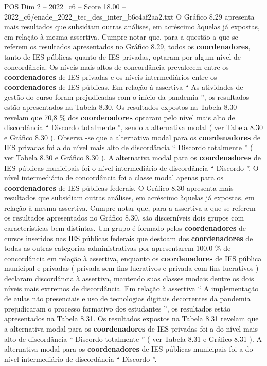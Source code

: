 \begin{textsample}{POS Dim 2 – 2022\_c6 – Score 18.00 – 2022\_c6/enade\_2022\_tec\_des\_inter\_b6c4af2aa2.txt}
O Gráfico 8.29 apresenta mais resultados que subsidiam outras análises, em acréscimo àquelas já expostas, em relação à mesma assertiva.
Cumpre notar que, para a questão a que se referem os resultados apresentados no Gráfico 8.29, todos os \textbf{coordenadores}, tanto de IES públicas quanto de IES privadas, optaram por algum nível de concordância.
Os níveis mais altos de concordância prevalecem entre os \textbf{coordenadores} de IES privadas e os níveis intermediários entre os \textbf{coordenadores} de IES públicas.
Em relação à assertiva “ As atividades de gestão do curso foram prejudicadas com o início da pandemia ”, os resultados estão apresentados na Tabela 8.30.
Os resultados expostos na Tabela 8.30 revelam que 70,8 \% dos \textbf{coordenadores} optaram pelo nível mais alto de discordância “ Discordo totalmente ”, sendo a alternativa modal ( ver Tabela 8.30 e Gráfico 8.30 ).
Observa -se que a alternativa modal para os \textbf{coordenadores} de IES privadas foi a do nível mais alto de discordância “ Discordo totalmente ” ( ver Tabela 8.30 e Gráfico 8.30 ).
A alternativa modal para os \textbf{coordenadores} de IES públicas municipais foi o nível intermediário de discordância “ Discordo ”.
O nível intermediário de concordância foi a classe modal apenas para os \textbf{coordenadores} de IES públicas federais.
O Gráfico 8.30 apresenta mais resultados que subsidiam outras análises, em acréscimo àquelas já expostas, em relação à mesma assertiva.
Cumpre notar que, para a assertiva a que se referem os resultados apresentados no Gráfico 8.30, são discerníveis dois grupos com características bem distintas.
Um grupo é formado pelos \textbf{coordenadores} de cursos inseridos nas IES públicas federais que destoam dos \textbf{coordenadores} de todas as outras categorias administrativas por apresentarem 100,0 \% de concordância em relação à assertiva, enquanto os \textbf{coordenadores} de IES pública municipal e privadas ( privada sem fins lucrativos e privada com fins lucrativos ) declaram discordância à assertiva, mantendo suas classes modais dentre os dois níveis mais extremos de discordância.
Em relação à assertiva “ A implementação de aulas não presenciais e uso de tecnologias digitais decorrentes da pandemia prejudicaram o processo formativo dos estudantes ”, os resultados estão apresentados na Tabela 8.31.
Os resultados expostos na Tabela 8.31 revelam que a alternativa modal para os \textbf{coordenadores} de IES privadas foi a do nível mais alto de discordância “ Discordo totalmente ” ( ver Tabela 8.31 e Gráfico 8.31 ).
A alternativa modal para os \textbf{coordenadores} de IES públicas municipais foi a do nível intermediário de discordância “ Discordo ”.

\end{textsample}
